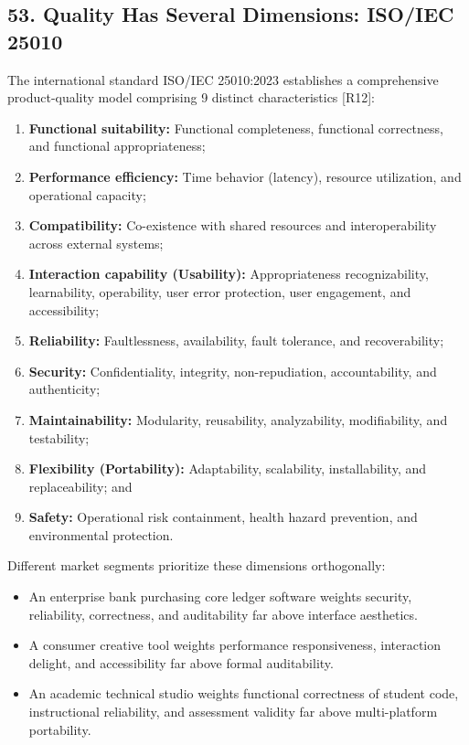 \subsection*{53. Quality Has Several Dimensions: ISO/IEC 25010}

The international standard ISO/IEC 25010:2023 establishes a comprehensive product-quality model comprising 9 distinct characteristics [R12]:
\begin{enumerate}
    \item \textbf{Functional suitability:} Functional completeness, functional correctness, and functional appropriateness;
    \item \textbf{Performance efficiency:} Time behavior (latency), resource utilization, and operational capacity;
    \item \textbf{Compatibility:} Co-existence with shared resources and interoperability across external systems;
    \item \textbf{Interaction capability (Usability):} Appropriateness recognizability, learnability, operability, user error protection, user engagement, and accessibility;
    \item \textbf{Reliability:} Faultlessness, availability, fault tolerance, and recoverability;
    \item \textbf{Security:} Confidentiality, integrity, non-repudiation, accountability, and authenticity;
    \item \textbf{Maintainability:} Modularity, reusability, analyzability, modifiability, and testability;
    \item \textbf{Flexibility (Portability):} Adaptability, scalability, installability, and replaceability; and
    \item \textbf{Safety:} Operational risk containment, health hazard prevention, and environmental protection.
\end{enumerate}

Different market segments prioritize these dimensions orthogonally:
\begin{itemize}
    \item An enterprise bank purchasing core ledger software weights security, reliability, correctness, and auditability far above interface aesthetics.
    \item A consumer creative tool weights performance responsiveness, interaction delight, and accessibility far above formal auditability.
    \item An academic technical studio weights functional correctness of student code, instructional reliability, and assessment validity far above multi-platform portability.
\end{itemize}


